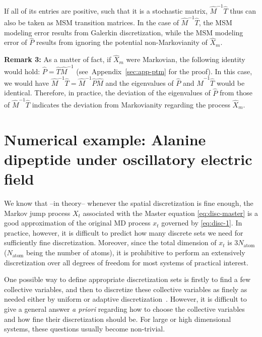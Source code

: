 \documentclass[journal=jctcce,manuscript=article]{achemso}
\begin{document}
If all of its entries are positive, such that it is a stochastic matrix, $\hat{M}^{-1}\hat{T}$ thus can also be taken as MSM transition matrices. In the case of $\hat{M}^{-1}\hat{T}$, the MSM modeling error results from Galerkin discretization, while the MSM modeling error of $\hat{P}$ results from ignoring the potential non-Markovianity of $\hat{X}_m$.

\textbf{Remark 3:} As a matter of fact, if $\hat X_m$ were Markovian, the following identity would hold: $\hat P = \hat T \hat M^{-1}$ (see~Appendix~\ref{sec:app-ptm} for the proof). In this case, we would have $\hat{M}^{-1}\hat{T}=\hat{M}^{-1}\hat{P}\hat{M}$ and the eigenvalues of $\hat{P}$ and $\hat{M}^{-1}\hat{T}$ would be identical.
Therefore, in practice, the deviation of the eigenvalues of $\hat P$ from those of $\hat{M}^{-1}\hat{T}$ indicates the deviation from Markovianity regarding the process $\hat{X}_m$.





\section{Numerical example:
  Alanine dipeptide under oscillatory electric field}
\label{sec:alanine}

We know that --in theory-- whenever the spatial discretization is fine enough, the Markov jump
process $X_t$ associated with the Master equation \eqref{eq:disc-master} is a good approximation of the original
MD process $x_t$ governed by \eqref{eq:disc-1}.  In practice, however, it is difficult to predict
how many discrete sets we need for sufficiently fine discretization. Moreover, since the
total dimension of $x_t$ is $3N_{\textrm{atom}}$ ($N_{\textrm{atom}}$ being the number of atoms), it is prohibitive to perform an extensively discretization
over all degrees of freedom for most systems of practical interest.

One possible way to define appropriate discretization sets is firstly to find a few collective
variables, and then to discretize these collective variables as finely as needed either by uniform or adaptive
discretization~\cite{chodera2007automatic, prinz2011markov}.
However, it is difficult to give a general answer \emph{a priori} regarding
how to choose the collective variables and how fine their discretization should be.
For large or high dimensional systems, these questions usually become non-trivial. 
\end{document}
